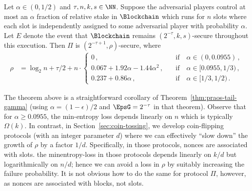 \begin{theorem}\label{thm:minentropy-loss-praos}
  Let $\alpha \in (0, 1/2)$ and $\tau, n, k, s \in \NN$. 
  Suppose the adversarial players control at most an $\alpha$ fraction of relative stake 
  in $\Blockchain$ 
  which runs for $n$ slots where 
  each slot is independently assigned to some adversarial player 
  with probability $\alpha$. 
  Let $E$ denote the event that 
  $\Blockchain$ 
  remains $(2^{-\tau}, k, s)$-secure throughout this execution. 
  Then $\Pi$ is $(2^{-\tau + 1}, \rho)$-secure, where 
  \begin{align}
    \rho &= \log_2 n + \tau/2 + n \cdot 
      \begin{cases}
        0
            \,, &\quad\text{if}\quad\alpha \in (0, 0.0955)\,, \\
        0.067 + 1.92 \alpha - 1.44 \alpha^2
            \,, &\quad\text{if}\quad\alpha \in [0.0955, 1/3)\,, \\
        0.237 + 0.86 \alpha
            \,, &\quad\text{if}\quad\alpha \in [1/3, 1/2)\,.
      \end{cases}    
  \end{align}
\end{theorem}
The theorem above is a straightforward corollary 
of Theorem~\ref{thm:praos-tail-gamma} 
(using $\alpha = (1 - \epsilon)/2$ 
and $\EpsG = 2^{-\tau}$ in that theorem).
Observe that for $\alpha \geq 0.0955$, 
the min-entropy loss depends linearly on $n$ 
which is typically $\Omega(k)$. 
In contrast, in Section~\ref{sec:coin-tossing}, 
we develop coin-flipping protocols (with an integer parameter $d$) 
where we can effectively ``slow down'' the growth of $\rho$ by a factor $1/d$.
Specifically, 
in those protocols, nonces are associated with slots.
the minentropy-loss in those protocols 
depends linearly on $k/d$ 
but logarithmically on $n/d$; 
hence we can avoid a loss in $\rho$ 
by suitably increasing the failure probability.
It is not obvious how to do the same for protocol $\Pi$, however, 
as nonces are associated with blocks, not slots. 


